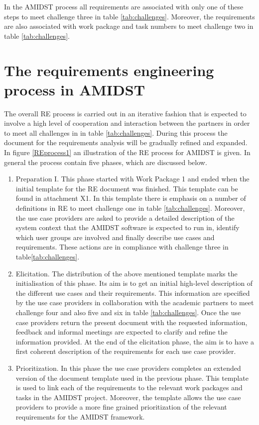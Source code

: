 \documentclass[11pt, oneside]{article}   	%
\begin{document}
In the AMIDST process all requirements are associated with only one of these steps to meet challenge three in table  \ref{tab:challenges}.  Moreover, the requirements are also associated with work package and task numbers to meet challenge two in table \ref{tab:challenges}.

\section{The requirements engineering process in AMIDST}
\label{sec:reprocess}

The overall RE process is carried out in an iterative fashion that is expected to involve a high level of cooperation and interaction between the partners in order to meet all challenges in in table \ref{tab:challenges}. During this process the document for the requirements analysis will be gradually refined and expanded. In figure \ref{REprocess1}  an illustration of the RE process for AMIDST is given.  In general the process contain five phases, which are discussed below.\begin{enumerate}
 \item Preparation I.  This phase started with Work Package 1 and ended when the initial template for the RE document was finished.  This template can be found in attachment X1. In this template there is emphasis on a number of definitions in RE to meet challenge one in table \ref{tab:challenges}.  Moreover, the use case providers are asked to provide a detailed description of the system context that the AMIDST software is expected to run in, identify which user groups are involved and finally describe use cases and requirements.  These actions are in compliance with challenge three in table\ref{tab:challenges}.  
\item Elicitation. The distribution of the above mentioned template marks the initialisation of this phase.  Its aim is to get an initial high-level description of the different use cases and their requirements. This information are specified by the use case providers in collaboration with the academic partners to meet challenge four and also five and six in table \ref{tab:challenges}.  Once the use case providers return the present document with the requested information, feedback and informal meetings are expected to clarify and refine the information provided.  At the end of the elicitation phase, the aim is to have a first coherent description of the requirements for each use case provider.
 \item Prioritization. In this phase the use case providers completes an extended version of the document template used in the previous phase. This template is used to link each of the requirements to the relevant work packages and tasks in the AMIDST project. Moreover, the template allows the use case providers to provide a more fine grained prioritization of the relevant requirements for the AMIDST framework.  

\end{enumerate}
\end{document}
